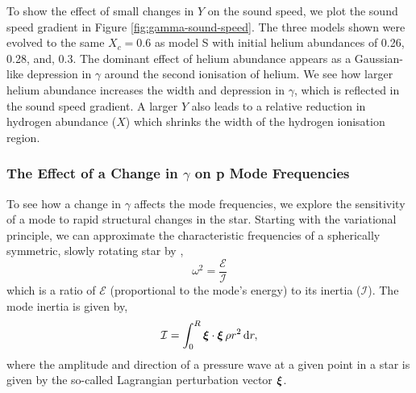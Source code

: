To show the effect of small changes in \(Y\) on the sound speed, we plot the sound speed gradient in Figure \ref{fig:gamma-sound-speed}. The three models shown were evolved to the same \(X_c = 0.6\) as model S with initial helium abundances of 0.26, 0.28, and, 0.3. The dominant effect of helium abundance appears as a Gaussian-like depression in \(\gamma\) around the second ionisation of helium. We see how larger helium abundance increases the width and depression in \(\gamma\), which is reflected in the sound speed gradient. A larger \(Y\) also leads to a relative reduction in hydrogen abundance (\(X\)) which shrinks the width of the hydrogen ionisation region.

\subsubsection{The Effect of a Change in \(\gamma\) on p Mode Frequencies}

To see how a change in \(\gamma\) affects the mode frequencies, we explore the sensitivity of a mode to rapid structural changes in the star. Starting with the variational principle, we can approximate the characteristic frequencies of a spherically symmetric, slowly rotating star by \citep{Chandrasekhar1964},
%
\begin{equation}
    \omega^2 = \frac{\mathcal{E}}{\mathcal{I}}\label{eq:var-prin}
\end{equation}
%
which is a ratio of \(\mathcal{E}\) (proportional to the mode's energy)
%
%
to its inertia (\(\mathcal{I}\)). The mode inertia is given by,
%
\begin{equation}
    \mathcal{I} = \int_0^R \bm{\xi} \cdot \bm{\xi} \, \rho r^2 \, \mathrm{d} r,
\end{equation}
%
where the amplitude and direction of a pressure wave at a given point in a star is given by the so-called Lagrangian perturbation vector \(\bm{\xi}\). 


